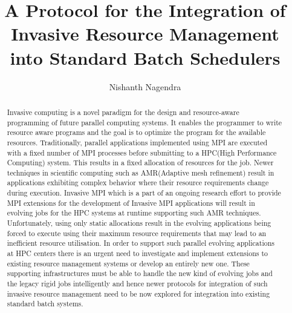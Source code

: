 \documentclass{article}
\begin{document}
\title{A Protocol for the Integration of Invasive Resource Management into Standard Batch Schedulers}
\author{Nishanth Nagendra}

\maketitle

\begin{abstract}
Invasive computing is a novel paradigm for the design and resource-aware programming of future parallel computing systems. It enables the programmer to write resource aware programs and the goal is to optimize the program for the available resources. Traditionally, parallel applications implemented using MPI are executed with a fixed number of MPI processes before submitting to a HPC(High Performance Computing) system. This results in a fixed allocation of resources for the job. Newer techniques in scientific computing such as AMR(Adaptive mesh refinement) result in applications exhibiting complex behavior where their resource requirements change during execution. Invasive MPI which is a part of an ongoing research effort to provide MPI extensions for the development of Invasive MPI applications will result in evolving jobs for the HPC systems at runtime supporting such AMR techniques. Unfortunately, using only static allocations result in the evolving applications being forced to execute using their maximum resource requirements that may lead to an inefficient resource utilisation. In order to support such parallel evolving applications at HPC centers there is an urgent need to investigate and implement extensions to existing resource management systems or develop an entirely new one. These supporting infrastructures must be able to handle the new kind of evolving jobs and the legacy rigid jobs intelligently and hence newer protocols for integration of such invasive resource management need to be now explored for integration into existing standard batch systems.
\end{abstract}
\end{document}
